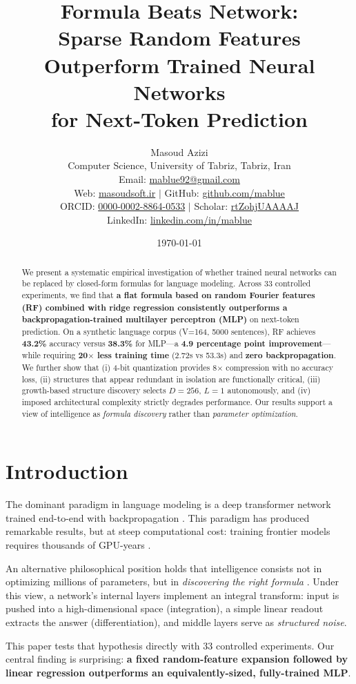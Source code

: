 \documentclass[11pt,a4paper]{article}
\title{\textbf{Formula Beats Network:\\Sparse Random Features Outperform Trained Neural Networks\\for Next-Token Prediction}}
\author{
  Masoud Azizi \\
  \small Computer Science, University of Tabriz, Tabriz, Iran \\
  \small Email: \href{mailto:mablue92@gmail.com}{mablue92@gmail.com} \\
  \small Web: \href{https://masoudsoft.ir}{masoudsoft.ir} $|$
  GitHub: \href{https://github.com/mablue}{github.com/mablue} \\
  \small ORCID: \href{https://orcid.org/0000-0002-8864-0533}{0000-0002-8864-0533} $|$
  Scholar: \href{https://scholar.google.com/citations?user=rtZohjUAAAAJ}{rtZohjUAAAAJ} \\
  \small LinkedIn: \href{https://www.linkedin.com/in/mablue}{linkedin.com/in/mablue}
}
\date{\today}
\begin{document}
\maketitle

\begin{abstract}
We present a systematic empirical investigation of whether trained neural networks can be replaced by closed-form formulas for language modeling. Across 33 controlled experiments, we find that \textbf{a flat formula based on random Fourier features (RF) combined with ridge regression consistently outperforms a backpropagation-trained multilayer perceptron (MLP)} on next-token prediction. On a synthetic language corpus (V=164, 5000 sentences), RF achieves \textbf{43.2\%} accuracy versus \textbf{38.3\%} for MLP---a \textbf{4.9 percentage point improvement}---while requiring \textbf{20$\times$ less training time} (2.72s vs 53.3s) and \textbf{zero backpropagation}. We further show that (i) 4-bit quantization provides 8$\times$ compression with no accuracy loss, (ii) structures that appear redundant in isolation are functionally critical, (iii) growth-based structure discovery selects $D=256$, $L=1$ autonomously, and (iv) imposed architectural complexity strictly degrades performance. Our results support a view of intelligence as \emph{formula discovery} rather than \emph{parameter optimization}.
\end{abstract}

\section{Introduction}
The dominant paradigm in language modeling is a deep transformer network trained end-to-end with backpropagation \citep{vaswani2017attention}. This paradigm has produced remarkable results, but at steep computational cost: training frontier models requires thousands of GPU-years \citep{kaplan2020scaling}.

An alternative philosophical position holds that intelligence consists not in optimizing millions of parameters, but in \emph{discovering the right formula} \citep{brunton2016discovering}. Under this view, a network's internal layers implement an integral transform: input is pushed into a high-dimensional space (integration), a simple linear readout extracts the answer (differentiation), and middle layers serve as \emph{structured noise}.

This paper tests that hypothesis directly with 33 controlled experiments. Our central finding is surprising: \textbf{a fixed random-feature expansion followed by linear regression outperforms an equivalently-sized, fully-trained MLP}.
\end{document}
